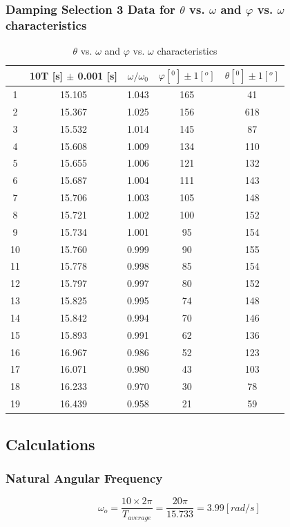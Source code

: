 \documentclass[12pt]{article}
\begin{document}
\subsubsection{Damping Selection 3 Data for $\theta$ vs. $\omega$ and $\varphi$ vs. $\omega$ characteristics}
\begin{table}[H]
\centering
\begin{tabular}{|c|c|c|c|c|}
\hline
   & 10T [s] $\pm$ 0.001 [s] &$\omega/\omega_{0}$&$\varphi [^0] \pm 1 [^o]$&$\theta [^0] \pm 1 [^o]$     \\ \hline
1  & 15.105 &1.043& 165 & 41  \\ \hline
2  & 15.367 &1.025& 156 &618  \\ \hline
3  & 15.532 &1.014& 145 & 87  \\ \hline
4  & 15.608 &1.009& 134 & 110 \\ \hline
5  & 15.655 &1.006& 121 & 132 \\ \hline
6  & 15.687 &1.004& 111 & 143 \\ \hline
7  & 15.706 &1.003& 105 & 148 \\ \hline
8  & 15.721 &1.002& 100 & 152 \\ \hline
9  & 15.734 &1.001& 95  & 154 \\ \hline
10 & 15.760 &0.999& 90 & 155 \\ \hline
11 & 15.778 &0.998& 85  & 154 \\ \hline
12 & 15.797 &0.997& 80  & 152 \\ \hline
13 & 15.825 &0.995& 74  & 148 \\ \hline
14 & 15.842 &0.994& 70  & 146 \\ \hline
15 & 15.893 &0.991& 62  & 136 \\ \hline
16 & 16.967 &0.986& 52  & 123 \\ \hline
17 & 16.071 &0.980& 43  & 103 \\ \hline
18 & 16.233 &0.970& 30  & 78 \\ \hline
19 & 16.439 &0.958& 21  & 59  \\ \hline
\end{tabular}
\caption{$\theta$ vs. $\omega$ and $\varphi$ vs. $\omega$ characteristics}
\end{table}
\subsection{Calculations}
\subsubsection{Natural Angular Frequency}
$$\omega_o=\frac{10\times2\pi}{T_{average}}=\frac{20\pi}{15.733}=3.99[rad/s]$$
\end{document}
